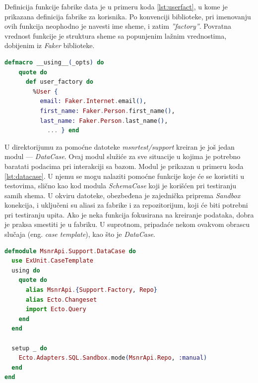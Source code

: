 \documentclass[12pt,oneside]{memoir}
\begin{document}
\par Definicija funkcije fabrike data je u primeru koda \ref{lst:userfact}, u kome je prikazana definicija fabrike za korisnika. Po konvenciji biblioteke, pri imenovanju ovih funkcija neophodno je navesti ime sheme, i zatim \emph{''{\textunderscore}factory''}. Povratna vrednost funkcije je struktura sheme sa popunjenim lažnim vrednostima, dobijenim iz \emph{Faker} biblioteke. \\

\begin{minipage}{\linewidth}
\begin{lstlisting}[language=elixir, basicstyle=\small, caption={Definicija modula \emph{UserFactory}},captionpos=b, label={lst:userfact}]
  defmacro __using__(_opts) do
    quote do
      def user_factory do
        %User {
          email: Faker.Internet.email(),
          first_name: Faker.Person.first_name(),
          last_name: Faker.Person.last_name(),
         	... } end
\end{lstlisting}
\end{minipage}

\par U direktorijumu za pomoćne datoteke \emph{msnr{\textunderscore}test/support} kreiran je još jedan modul --- \emph{DataCase}. Ovaj modul služiće za sve situacije u kojima je potrebno baratati podacima pri interakciji sa bazom. Modul je prikazan u primeru koda \ref{lst:datacase}. U njemu se mogu nalaziti pomoćne funkcije koje će se koristiti u testovima, slično kao kod modula \emph{SchemaCase} koji je korišćen pri testiranju samih shema. U okviru datoteke, obezbeđena je zajednička priprema \emph{Sandbox} konekcija, i uključeni su aliasi za fabrike i za repozitorijum, koji će biti potrebni pri testiranju upita. Ako je neka funkcija fokusirana na kreiranje podataka, dobra je praksa smestiti je u fabriku. U suprotnom, pripadaće nekom ovakvom obrascu slučaja (eng. \emph{case template}), kao što je \emph{DataCase}. \\ 

\begin{minipage}{\linewidth}
\begin{lstlisting}[language=elixir, basicstyle=\small, caption={Definicija modula \emph{DataCase}},captionpos=b, label={lst:datacase}]
defmodule MsnrApi.Support.DataCase do
  use ExUnit.CaseTemplate
  using do
    quote do
      alias MsnrApi.{Support.Factory, Repo}
      alias Ecto.Changeset
      import Ecto.Query
    end
  end

  setup _ do
    Ecto.Adapters.SQL.Sandbox.mode(MsnrApi.Repo, :manual)
  end
end
\end{lstlisting}
\end{minipage}
\end{document}

